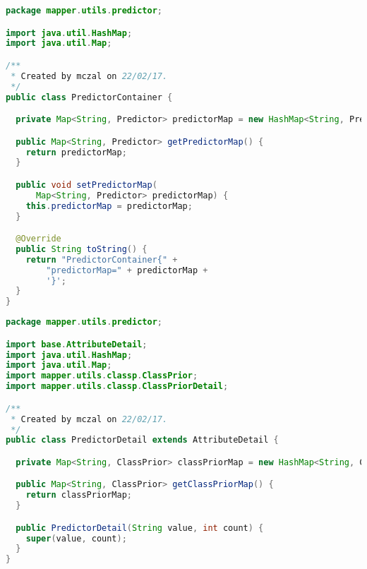 \begin{lstlisting}[language=Java,basicstyle=\tiny,caption=PredictorContainer.java]
package mapper.utils.predictor;

import java.util.HashMap;
import java.util.Map;

/**
 * Created by mczal on 22/02/17.
 */
public class PredictorContainer {

  private Map<String, Predictor> predictorMap = new HashMap<String, Predictor>();

  public Map<String, Predictor> getPredictorMap() {
    return predictorMap;
  }

  public void setPredictorMap(
      Map<String, Predictor> predictorMap) {
    this.predictorMap = predictorMap;
  }

  @Override
  public String toString() {
    return "PredictorContainer{" +
        "predictorMap=" + predictorMap +
        '}';
  }
}
\end{lstlisting}


\begin{lstlisting}[language=Java,basicstyle=\tiny,caption=PredictorDetail.java]
package mapper.utils.predictor;

import base.AttributeDetail;
import java.util.HashMap;
import java.util.Map;
import mapper.utils.classp.ClassPrior;
import mapper.utils.classp.ClassPriorDetail;

/**
 * Created by mczal on 22/02/17.
 */
public class PredictorDetail extends AttributeDetail {

  private Map<String, ClassPrior> classPriorMap = new HashMap<String, ClassPrior>();

  public Map<String, ClassPrior> getClassPriorMap() {
    return classPriorMap;
  }

  public PredictorDetail(String value, int count) {
    super(value, count);
  }
}
\end{lstlisting}


